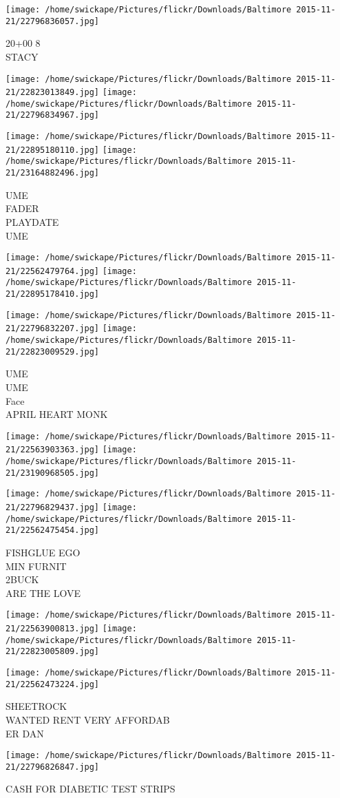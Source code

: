 \documentclass[10pt,letterpaper]{article}
\begin{document}
\vspace{0.25in}
\texttt{[image: /home/swickape/Pictures/flickr/Downloads/Baltimore 2015-11-21/22796836057.jpg]}

20+00 8\\
STACY
\pagebreak

\texttt{[image: /home/swickape/Pictures/flickr/Downloads/Baltimore 2015-11-21/22823013849.jpg]}
\texttt{[image: /home/swickape/Pictures/flickr/Downloads/Baltimore 2015-11-21/22796834967.jpg]}

\texttt{[image: /home/swickape/Pictures/flickr/Downloads/Baltimore 2015-11-21/22895180110.jpg]}
\texttt{[image: /home/swickape/Pictures/flickr/Downloads/Baltimore 2015-11-21/23164882496.jpg]}

UME\\
FADER\\
PLAYDATE\\
UME
\pagebreak

\texttt{[image: /home/swickape/Pictures/flickr/Downloads/Baltimore 2015-11-21/22562479764.jpg]}
\texttt{[image: /home/swickape/Pictures/flickr/Downloads/Baltimore 2015-11-21/22895178410.jpg]}

\texttt{[image: /home/swickape/Pictures/flickr/Downloads/Baltimore 2015-11-21/22796832207.jpg]}
\texttt{[image: /home/swickape/Pictures/flickr/Downloads/Baltimore 2015-11-21/22823009529.jpg]}

UME\\
UME\\
Face\\
APRIL HEART MONK
\pagebreak

\texttt{[image: /home/swickape/Pictures/flickr/Downloads/Baltimore 2015-11-21/22563903363.jpg]}
\texttt{[image: /home/swickape/Pictures/flickr/Downloads/Baltimore 2015-11-21/23190968505.jpg]}

\texttt{[image: /home/swickape/Pictures/flickr/Downloads/Baltimore 2015-11-21/22796829437.jpg]}
\texttt{[image: /home/swickape/Pictures/flickr/Downloads/Baltimore 2015-11-21/22562475454.jpg]}

FISHGLUE EGO\\
MIN FURNIT\\
2BUCK\\
ARE THE LOVE
\pagebreak

\texttt{[image: /home/swickape/Pictures/flickr/Downloads/Baltimore 2015-11-21/22563900813.jpg]}
\texttt{[image: /home/swickape/Pictures/flickr/Downloads/Baltimore 2015-11-21/22823005809.jpg]}

\texttt{[image: /home/swickape/Pictures/flickr/Downloads/Baltimore 2015-11-21/22562473224.jpg]}

SHEETROCK\\
WANTED RENT VERY AFFORDAB\\
ER DAN
\pagebreak

\texttt{[image: /home/swickape/Pictures/flickr/Downloads/Baltimore 2015-11-21/22796826847.jpg]}

CASH FOR DIABETIC TEST STRIPS
\pagebreak
\end{document}
